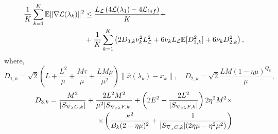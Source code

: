 \documentclass[11pt, twoside]{report}
\begin{document}
\begin{align}
\frac{1}{K}\sum_{k=1}^K \mathbb{E}\|\nabla\mathcal{L}(\lambda_k)\|^2 &\leq  \frac{L_\mathcal{L}\left(4\mathcal{L}(\lambda_1) - 4\mathcal{L}_{inf}\right)}{K} + \notag\\
&+\frac{1}{K}\sum_{k=1}^K \left(2D_{3,k}\nu_k^2 L^2_{\mathcal{L}} + 6\nu_kL_\mathcal{L}\mathbb{E}[D_{1,k}^2] + 6\nu_k D_{2,k}^2\right), \label{tele_ineq2}
\end{align}
where,
\[D_{1,k} = \sqrt{2}\left(L + \frac{L^2}{\mu} + \frac{M\tau}{\mu} + \frac{LM\rho}{\mu^2} \right) \|\hat{x}(\lambda_k) - x_k\|, \quad D_{2,k} = \sqrt{2} \frac{LM(1-\eta \mu)^{Q_k}}{\mu},\]
\begin{align}
        D_{3,k} = \frac{M^2}{|S_{\nabla_\lambda C,k}|}
+
\frac{2L^2M^2}{\mu^2|S_{\nabla_{x\lambda}F,k}|} +
\left(
2E^2+\frac{2L^2}{|S_{\nabla_{x\lambda}F,k}|}
\right)2\eta^2M^2 \times \notag \\
\times\left(
\frac{\kappa^2}{B_k(2-\eta\mu)^2}
+
\frac{1}{|S_{\nabla_x C,k}|(2\eta\mu-\eta^2\mu^2)}
\right) \label{varbndthm2}
\end{align}
\end{document}
